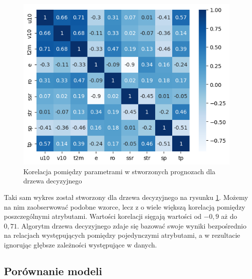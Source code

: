 \begin{figure}[H]
    \centering
    \includegraphics[width=\textwidth]{images/dt_corr_matrix.png}
    \caption{Korelacja pomiędzy parametrami w stworzonych prognozach dla drzewa decyzyjnego}
    \label{dt-corr-matrix}
\end{figure}

Taki sam wykres został stworzony dla drzewa decyzyjnego na rysunku \ref{dt-corr-matrix}. Możemy na nim 
zaobserwować podobne wzorce, lecz z o wiele większą korelacją pomiędzy poszczególnymi atrybutami. 
Wartości korelacji sięgają wartości od $-0,9$ aż do $0,71$. Algorytm drzewa decyzyjnego zdaje się 
bazować swoje wyniki bezpośrednio na relacjach występujących pomiędzy pojedynczymi atrybutami,
a w rezultacie ignorując głębsze zależności występujące w danych.



\subsection{Porównanie modeli}

